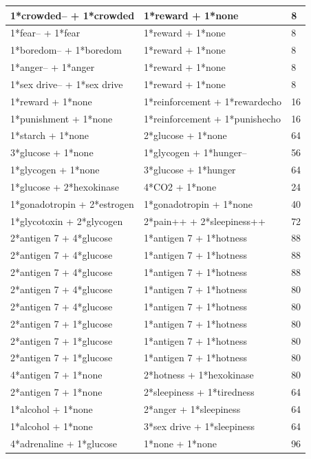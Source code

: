 \documentclass{article}
\begin{document}
\begin{longtable}{|p{7cm}|p{7cm}|p{2cm}|}
1*crowded-- + 1*crowded & 1*reward + 1*none & 8 \\ \hline
1*fear-- + 1*fear & 1*reward + 1*none & 8 \\ \hline
1*boredom-- + 1*boredom & 1*reward + 1*none & 8 \\ \hline
1*anger-- + 1*anger & 1*reward + 1*none & 8 \\ \hline
1*sex drive-- + 1*sex drive & 1*reward + 1*none & 8 \\ \hline
1*reward + 1*none & 1*reinforcement + 1*rewardecho & 16 \\ \hline
1*punishment + 1*none & 1*reinforcement + 1*punishecho & 16 \\ \hline
1*starch + 1*none & 2*glucose + 1*none & 64 \\ \hline
3*glucose + 1*none & 1*glycogen + 1*hunger-- & 56 \\ \hline
1*glycogen + 1*none & 3*glucose + 1*hunger & 64 \\ \hline
1*glucose + 2*hexokinase & 4*CO2 + 1*none & 24 \\ \hline
1*gonadotropin + 2*estrogen & 1*gonadotropin + 1*none & 40 \\ \hline
1*glycotoxin + 2*glycogen & 2*pain++ + 2*sleepiness++ & 72 \\ \hline
2*antigen 7 + 4*glucose & 1*antigen 7 + 1*hotness & 88 \\ \hline
2*antigen 7 + 4*glucose & 1*antigen 7 + 1*hotness & 88 \\ \hline
2*antigen 7 + 4*glucose & 1*antigen 7 + 1*hotness & 88 \\ \hline
2*antigen 7 + 4*glucose & 1*antigen 7 + 1*hotness & 80 \\ \hline
2*antigen 7 + 4*glucose & 1*antigen 7 + 1*hotness & 80 \\ \hline
2*antigen 7 + 1*glucose & 1*antigen 7 + 1*hotness & 80 \\ \hline
2*antigen 7 + 1*glucose & 1*antigen 7 + 1*hotness & 80 \\ \hline
2*antigen 7 + 1*glucose & 1*antigen 7 + 1*hotness & 80 \\ \hline
4*antigen 7 + 1*none & 2*hotness + 1*hexokinase & 80 \\ \hline
2*antigen 7 + 1*none & 2*sleepiness + 1*tiredness & 64 \\ \hline
1*alcohol + 1*none & 2*anger + 1*sleepiness & 64 \\ \hline
1*alcohol + 1*none & 3*sex drive + 1*sleepiness & 64 \\ \hline
4*adrenaline + 1*glucose & 1*none + 1*none & 96 \\ \hline

\end{longtable}
\end{document}
